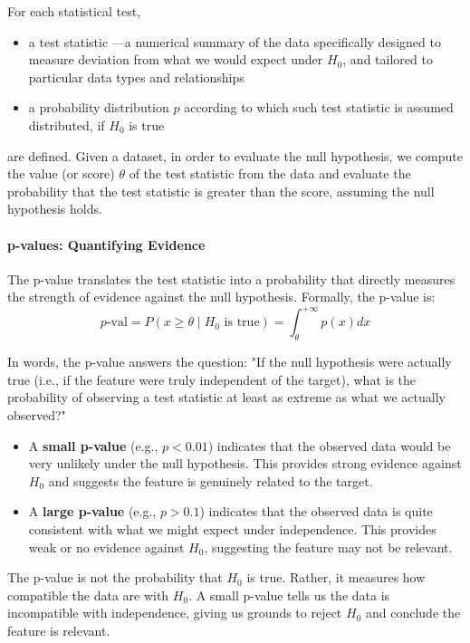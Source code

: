 For each statistical test, 
\begin{itemize} 
\item a \alert{test statistic} —a numerical summary of the data specifically designed to measure deviation from what we would expect under $H_0$, and tailored to particular data types and relationships
\item a probability distribution $p$ according to which such test statistic is assumed distributed, if $H_0$ is true
\end{itemize}
are defined.
Given a dataset, in order to evaluate the null hypothesis, we compute the value  (or \alert{score}) $\theta$ of the test statistic from the data and evaluate the probability that the test statistic is greater than the score, assuming the null hypothesis holds.

\paragraph{p-values: Quantifying Evidence}

The \alert{p-value} translates the test statistic into a probability that directly measures the strength of evidence against the null hypothesis. Formally, the p-value is:
$$
p\text{-val} = P(x \geq\theta \mid H_0 \text{ is true})=\int_{\theta}^{+\infty}p(x)dx
$$

In words, the p-value answers the question: "If the null hypothesis were actually true (i.e., if the feature were truly independent of the target), what is the probability of observing a test statistic at least as extreme as what we actually observed?"

\begin{itemize}
\item A \textbf{small p-value} (e.g., $p < 0.01$) indicates that the observed data would be very unlikely under the null hypothesis. This provides strong evidence \alert{against} $H_0$ and suggests the feature is genuinely related to the target.
\item A \textbf{large p-value} (e.g., $p > 0.1$) indicates that the observed data is quite consistent with what we might expect under independence. This provides weak or no evidence against $H_0$, suggesting the feature may not be relevant.
\end{itemize}

The p-value is \alert{not} the probability that $H_0$ is true. Rather, it measures how compatible the data are with $H_0$. A small p-value tells us the data is incompatible with independence, giving us grounds to reject $H_0$ and conclude the feature is relevant.

